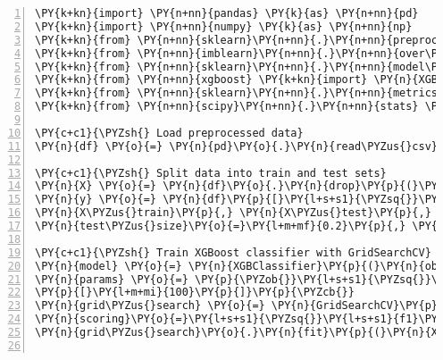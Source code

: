 \documentclass[12pt]{article}
\begin{document}
\begin{Verbatim}[commandchars=\\\{\},numbers=left,firstnumber=1,stepnumber=1,formatcom=\footnotesize]
\PY{k+kn}{import} \PY{n+nn}{pandas} \PY{k}{as} \PY{n+nn}{pd}
\PY{k+kn}{import} \PY{n+nn}{numpy} \PY{k}{as} \PY{n+nn}{np}
\PY{k+kn}{from} \PY{n+nn}{sklearn}\PY{n+nn}{.}\PY{n+nn}{preprocessing} \PY{k+kn}{import} \PY{n}{MinMaxScaler}
\PY{k+kn}{from} \PY{n+nn}{imblearn}\PY{n+nn}{.}\PY{n+nn}{over\PYZus{}sampling} \PY{k+kn}{import} \PY{n}{RandomOverSampler}
\PY{k+kn}{from} \PY{n+nn}{sklearn}\PY{n+nn}{.}\PY{n+nn}{model\PYZus{}selection} \PY{k+kn}{import} \PY{n}{train\PYZus{}test\PYZus{}split}\PY{p}{,} \PY{n}{GridSearchCV}
\PY{k+kn}{from} \PY{n+nn}{xgboost} \PY{k+kn}{import} \PY{n}{XGBClassifier}
\PY{k+kn}{from} \PY{n+nn}{sklearn}\PY{n+nn}{.}\PY{n+nn}{metrics} \PY{k+kn}{import} \PY{n}{classification\PYZus{}report}\PY{p}{,} \PY{n}{confusion\PYZus{}matrix}
\PY{k+kn}{from} \PY{n+nn}{scipy}\PY{n+nn}{.}\PY{n+nn}{stats} \PY{k+kn}{import} \PY{n}{chi2\PYZus{}contingency}

\PY{c+c1}{\PYZsh{} Load preprocessed data}
\PY{n}{df} \PY{o}{=} \PY{n}{pd}\PY{o}{.}\PY{n}{read\PYZus{}csv}\PY{p}{(}\PY{l+s+s1}{\PYZsq{}}\PY{l+s+s1}{diabetes\PYZus{}preprocessed.csv}\PY{l+s+s1}{\PYZsq{}}\PY{p}{)}

\PY{c+c1}{\PYZsh{} Split data into train and test sets}
\PY{n}{X} \PY{o}{=} \PY{n}{df}\PY{o}{.}\PY{n}{drop}\PY{p}{(}\PY{p}{[}\PY{l+s+s1}{\PYZsq{}}\PY{l+s+s1}{Diabetes\PYZus{}binary}\PY{l+s+s1}{\PYZsq{}}\PY{p}{]}\PY{p}{,} \PY{n}{axis}\PY{o}{=}\PY{l+m+mi}{1}\PY{p}{)}
\PY{n}{y} \PY{o}{=} \PY{n}{df}\PY{p}{[}\PY{l+s+s1}{\PYZsq{}}\PY{l+s+s1}{Diabetes\PYZus{}binary}\PY{l+s+s1}{\PYZsq{}}\PY{p}{]}
\PY{n}{X\PYZus{}train}\PY{p}{,} \PY{n}{X\PYZus{}test}\PY{p}{,} \PY{n}{y\PYZus{}train}\PY{p}{,} \PY{n}{y\PYZus{}test} \PY{o}{=} \PY{n}{train\PYZus{}test\PYZus{}split}\PY{p}{(}\PY{n}{X}\PY{p}{,} \PY{n}{y}\PY{p}{,} \PYZbs{}
\PY{n}{test\PYZus{}size}\PY{o}{=}\PY{l+m+mf}{0.2}\PY{p}{,} \PY{n}{random\PYZus{}state}\PY{o}{=}\PY{l+m+mi}{42}\PY{p}{)}

\PY{c+c1}{\PYZsh{} Train XGBoost classifier with GridSearchCV}
\PY{n}{model} \PY{o}{=} \PY{n}{XGBClassifier}\PY{p}{(}\PY{n}{objective}\PY{o}{=}\PY{l+s+s1}{\PYZsq{}}\PY{l+s+s1}{binary:logistic}\PY{l+s+s1}{\PYZsq{}}\PY{p}{)}
\PY{n}{params} \PY{o}{=} \PY{p}{\PYZob{}}\PY{l+s+s1}{\PYZsq{}}\PY{l+s+s1}{max\PYZus{}depth}\PY{l+s+s1}{\PYZsq{}}\PY{p}{:} \PY{p}{[}\PY{l+m+mi}{3}\PY{p}{,} \PY{l+m+mi}{5}\PY{p}{]}\PY{p}{,} \PY{l+s+s1}{\PYZsq{}}\PY{l+s+s1}{learning\PYZus{}rate}\PY{l+s+s1}{\PYZsq{}}\PY{p}{:} \PY{p}{[}\PY{l+m+mf}{0.1}\PY{p}{]}\PY{p}{,} \PY{l+s+s1}{\PYZsq{}}\PY{l+s+s1}{n\PYZus{}estimators}\PY{l+s+s1}{\PYZsq{}}\PY{p}{:} \PYZbs{}
\PY{p}{[}\PY{l+m+mi}{100}\PY{p}{]}\PY{p}{\PYZcb{}}
\PY{n}{grid\PYZus{}search} \PY{o}{=} \PY{n}{GridSearchCV}\PY{p}{(}\PY{n}{estimator}\PY{o}{=}\PY{n}{model}\PY{p}{,} \PY{n}{param\PYZus{}grid}\PY{o}{=}\PY{n}{params}\PY{p}{,} \PYZbs{}
\PY{n}{scoring}\PY{o}{=}\PY{l+s+s1}{\PYZsq{}}\PY{l+s+s1}{f1}\PY{l+s+s1}{\PYZsq{}}\PY{p}{,} \PY{n}{cv}\PY{o}{=}\PY{l+m+mi}{3}\PY{p}{,} \PY{n}{n\PYZus{}jobs}\PY{o}{=}\PY{o}{\PYZhy{}}\PY{l+m+mi}{1}\PY{p}{)}
\PY{n}{grid\PYZus{}search}\PY{o}{.}\PY{n}{fit}\PY{p}{(}\PY{n}{X\PYZus{}train}\PY{p}{,} \PY{n}{y\PYZus{}train}\PY{p}{)}


\end{Verbatim}
\end{document}
